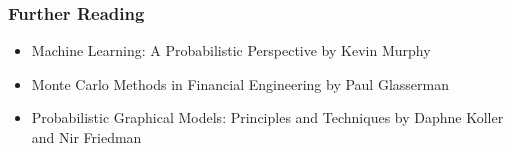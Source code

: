 \documentclass{beamer}
\begin{document}
\begin{frame}
\frametitle{Further Reading}
  \begin{itemize}
    \item Machine Learning: A Probabilistic Perspective by Kevin Murphy
    \item Monte Carlo Methods in Financial Engineering by Paul Glasserman
    \item Probabilistic Graphical Models: Principles and Techniques by Daphne Koller and Nir Friedman
  \end{itemize}
\end{frame}



\end{document}
